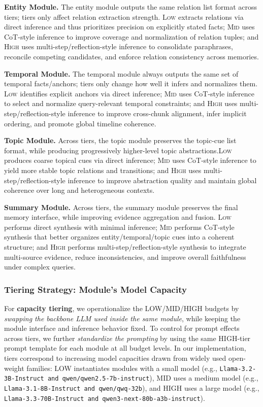 \textbf{Entity Module.}
The entity module outputs the same relation list format across tiers; tiers only affect relation extraction strength. \textsc{Low} extracts relations via direct inference and thus prioritizes precision on explicitly stated facts; \textsc{Mid} uses CoT-style inference to improve coverage and normalization of relation tuples; and \textsc{High} uses multi-step/reflection-style inference to consolidate paraphrases, reconcile competing candidates, and enforce relation consistency across memories.

\textbf{Temporal Module.}
The temporal module always outputs the same set of temporal facts/anchors; tiers only change how well it infers and normalizes them. \textsc{Low} identifies explicit anchors via direct inference; \textsc{Mid} uses CoT-style inference to select and normalize query-relevant temporal constraints; and \textsc{High} uses multi-step/reflection-style inference to improve cross-chunk alignment, infer implicit ordering, and promote global timeline coherence.

\textbf{Topic Module.}
Across tiers, the topic module preserves the topic-cue list format, while producing progressively higher-level topic abstractions.\textsc{Low} produces coarse topical cues via direct inference; \textsc{Mid} uses CoT-style inference to yield more stable topic relations and transitions; and \textsc{High} uses multi-step/reflection-style inference to improve abstraction quality and maintain global coherence over long and heterogeneous contexts.

\textbf{Summary Module.}
Across tiers, the summary module preserves the final memory interface, while improving evidence aggregation and fusion. \textsc{Low} performs direct synthesis with minimal inference; \textsc{Mid} performs CoT-style synthesis that better organizes entity/temporal/topic cues into a coherent structure; and \textsc{High} performs multi-step/reflection-style synthesis to integrate multi-source evidence, reduce inconsistencies, and improve overall faithfulness under complex queries.


\subsubsection{Tiering Strategy: Module's Model Capacity}
For \textbf{capacity tiering}, we operationalize the \textsc{LOW}/\textsc{MID}/\textsc{HIGH} budgets by \emph{swapping the backbone LLM used inside the same module}, while keeping the module interface and inference behavior fixed. 
To control for prompt effects across tiers, we further \emph{standardize the prompting} by using the same \textsc{HIGH}-tier prompt template for each module at all budget levels.
In our implementation, tiers correspond to increasing model capacities drawn from widely used open-weight families: \textsc{LOW} instantiates modules with a small model (e.g., \texttt{Llama-3.2-3B-Instruct and qwen/qwen2.5-7b-instruct}), \textsc{MID} uses a medium model (e.g., \texttt{Llama-3.1-8B-Instruct and qwen/qwq-32b}), and \textsc{HIGH} uses a large model (e.g., \texttt{Llama-3.3-70B-Instruct and qwen3-next-80b-a3b-instruct}).

